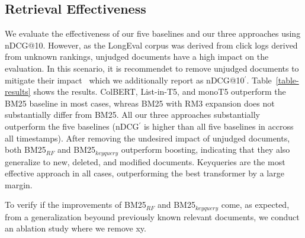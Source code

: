 \subsection{Retrieval Effectiveness}




We evaluate the effectiveness of our five baselines and our three approaches using nDCG@10. However, as the LongEval corpus was derived from click logs derived from unknown rankings, unjudged documents have a high impact on the evaluation. In this scenario, it is recommendet to remove unjudged documents to mitigate their impact~\cite{sakai:2007} which we additionally report as nDCG@10$^{'}$. Table~\ref{table-results} shows the results. ColBERT, List-in-T5, and monoT5 outperform the BM25 baseline in most cases, whreas BM25 with RM3 expansion does not substantially differ from BM25. All our three approaches substantially outperform the five baselines (nDCG$^{'}$ is higher than all five baselines in accross all timestamps). After removing the undesired impact of unjudged documents, both BM25$_{RF}$ and BM25$_{keyquery}$ outperform boosting, indicating that they also generalize to new, deleted, and modified documents. Keyqueries are the most effective approach in all cases, outperforming the best transformer by a large margin.



To verify if the improvements of BM25$_{RF}$ and BM25$_{keyquery}$ come, as expected, from a generalization beyound previously known relevant documents, we conduct an ablation study where we remove xy.
